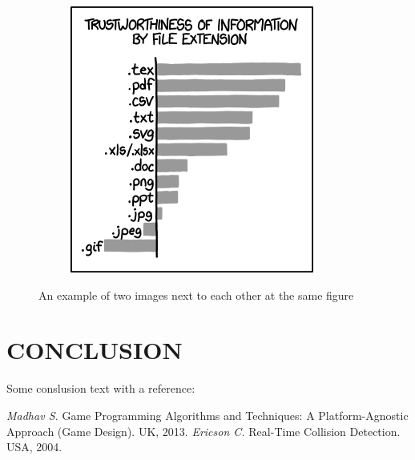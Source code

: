 \documentclass[intlimits,twoside,a4paper,11pt]{article}
\begin{document}
\begin{figure}[H]
\begin{subfigure}[t]{50mm}
            \includegraphics[width=\textwidth]{xkcd1301.png}
            \subcaption{} %
            \label{fig-example-2b}
        \end{subfigure}
        \caption{An example of two images next to each other at the same figure} \label{fig-example-2}
    \end{figure}

    \section{CONCLUSION}
    Some conslusion text with a reference:~\cite{lib-1,lib-2}

    \begin{thebibliography}{9}
         {\it Madhav S.} Game Programming Algorithms and Techniques: A Platform-Agnostic Approach (Game Design). UK, 2013.
         {\it Ericson C.} Real-Time Collision Detection. USA, 2004.
    \end{thebibliography}

\end{document}
